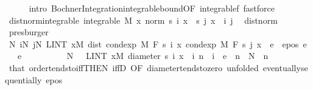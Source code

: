 \begin{isabellebody}
\ \ \ \ \isamarkupfalse%
\ {\isacharparenleft}{\kern0pt}intro\ Bochner{\isacharunderscore}{\kern0pt}Integration{\isachardot}{\kern0pt}integrable{\isacharunderscore}{\kern0pt}bound{\isacharbrackleft}{\kern0pt}OF\ integrable{\isacharunderscore}{\kern0pt}{}f{\isacharbrackright}{\kern0pt}{\isacharparenright}{\kern0pt}\ fastforce{\isacharplus}{\kern0pt}\isanewline
\ \ \ \isanewline
\ \ \isamarkupfalse%
\ dist{\isacharunderscore}{\kern0pt}norm{\isacharunderscore}{\kern0pt}integrable{\isacharcolon}{\kern0pt}\ {\isachardoublequoteopen}integrable\ M\ {\isacharparenleft}{\kern0pt}{\isasymlambda}x{\isachardot}{\kern0pt}\ norm\ {\isacharparenleft}{\kern0pt}s\ i\ x\ {\isacharminus}{\kern0pt}\ s\ j\ x{\isacharparenright}{\kern0pt}{\isacharparenright}{\kern0pt}{\isachardoublequoteclose}\ \ i\ j\ \isamarkupfalse%
\ dist{\isacharunderscore}{\kern0pt}norm\ \isamarkupfalse%
\ presburger\isanewline
\isanewline
\ \ \isamarkupfalse%
\ {\isachardoublequoteopen}{\isasymexists}N{\isachardot}{\kern0pt}\ {\isasymforall}i{\isasymge}N{\isachardot}{\kern0pt}\ {\isasymforall}j{\isasymge}N{\isachardot}{\kern0pt}\ LINT\ x{\isacharbar}{\kern0pt}M{\isachardot}{\kern0pt}\ dist\ {\isacharparenleft}{\kern0pt}cond{\isacharunderscore}{\kern0pt}exp\ M\ F\ {\isacharparenleft}{\kern0pt}s\ i{\isacharparenright}{\kern0pt}\ x{\isacharparenright}{\kern0pt}\ {\isacharparenleft}{\kern0pt}cond{\isacharunderscore}{\kern0pt}exp\ M\ F\ {\isacharparenleft}{\kern0pt}s\ j{\isacharparenright}{\kern0pt}\ x{\isacharparenright}{\kern0pt}\ {\isacharless}{\kern0pt}\ e{\isachardoublequoteclose}\ \ e{\isacharunderscore}{\kern0pt}pos{\isacharcolon}{\kern0pt}\ {\isachardoublequoteopen}e\ {\isachargreater}{\kern0pt}\ {}{\isachardoublequoteclose}\ \ e\isanewline
\ \ \isamarkupfalse%
\ {\isacharminus}{\kern0pt}\isanewline
\ \ \ \ \isamarkupfalse%
\ N\ \ {\isacharasterisk}{\kern0pt}{\isacharcolon}{\kern0pt}\ {\isachardoublequoteopen}LINT\ x{\isacharbar}{\kern0pt}M{\isachardot}{\kern0pt}\ diameter\ {\isacharbraceleft}{\kern0pt}s\ i\ x\ {\isacharbar}{\kern0pt}\ i{\isachardot}{\kern0pt}\ n\ {\isasymle}\ i{\isacharbraceright}{\kern0pt}\ {\isacharless}{\kern0pt}\ e{\isachardoublequoteclose}\ \ {\isachardoublequoteopen}n\ {\isasymge}\ N{\isachardoublequoteclose}\ \ n\ \isamarkupfalse%
\ that\ order{\isacharunderscore}{\kern0pt}tendsto{\isacharunderscore}{\kern0pt}iff{\isacharbrackleft}{\kern0pt}THEN\ iffD{}{\isacharcomma}{\kern0pt}\ OF\ diameter{\isacharunderscore}{\kern0pt}tendsto{\isacharunderscore}{\kern0pt}zero{\isacharcomma}{\kern0pt}\ unfolded\ eventually{\isacharunderscore}{\kern0pt}sequentially{\isacharbrackright}{\kern0pt}\ e{\isacharunderscore}{\kern0pt}pos\ \isamarkupfalse%

\end{isabellebody}
